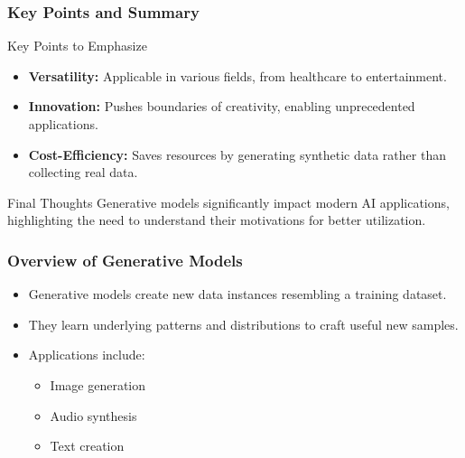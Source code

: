 \documentclass[aspectratio=169]{beamer}
\begin{document}
\begin{frame}[fragile]
    \frametitle{Key Points and Summary}
    \begin{block}{Key Points to Emphasize}
        \begin{itemize}
            \item \textbf{Versatility:} Applicable in various fields, from healthcare to entertainment.
            \item \textbf{Innovation:} Pushes boundaries of creativity, enabling unprecedented applications.
            \item \textbf{Cost-Efficiency:} Saves resources by generating synthetic data rather than collecting real data.
        \end{itemize}
    \end{block}
    \begin{block}{Final Thoughts}
        Generative models significantly impact modern AI applications, highlighting the need to understand their motivations for better utilization.
    \end{block}
\end{frame}

\begin{frame}[fragile]
    \frametitle{Overview of Generative Models}
    \begin{itemize}
        \item Generative models create new data instances resembling a training dataset.
        \item They learn underlying patterns and distributions to craft useful new samples.
        \item Applications include:
        \begin{itemize}
            \item Image generation
            \item Audio synthesis
            \item Text creation
        \end{itemize}
    \end{itemize}
\end{frame}
\end{document}
